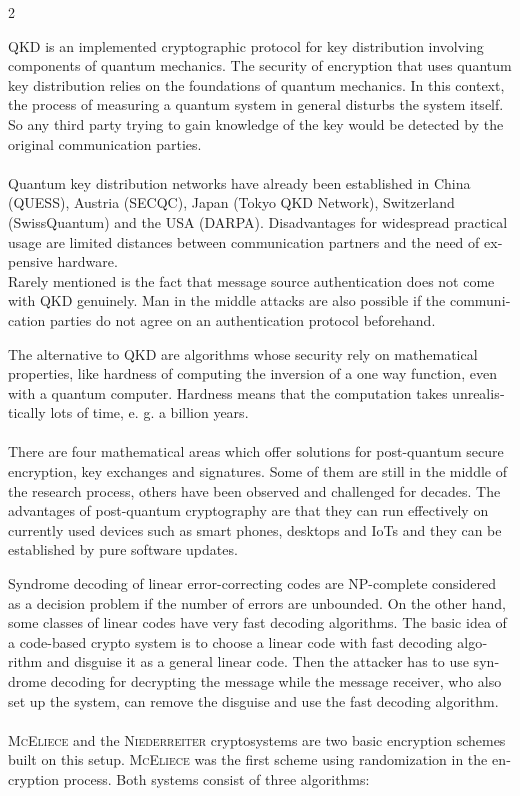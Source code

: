 \documentclass[a4paper,11pt]{article}
\begin{document}
\begin{otherlanguage}{english}
\begin{multicols}{2}

QKD is an implemented cryptographic protocol for key distribution involving components of quantum mechanics. The security of encryption that uses quantum key distribution relies on the foundations of quantum mechanics. In this context, the process of measuring a quantum system in general disturbs the system itself. So any third party trying to gain knowledge of the key would be detected by the original communication parties. \\ 
\\
Quantum key distribution networks have already been established in China (QUESS), Austria (SECQC), Japan (Tokyo QKD Network), Switzerland (SwissQuantum) and the USA (DARPA). 
Disadvantages for widespread practical usage are limited distances between communication partners and the need of expensive hardware. \\
Rarely mentioned is the fact that message source authentication does not come with QKD genuinely. Man in the middle attacks are also possible if the communication parties do not agree on an authentication protocol beforehand.  

\noindent
The alternative to QKD are algorithms whose security rely on mathematical properties, like hardness of computing the inversion of a one way function, even with a quantum computer. Hardness means that the computation takes unrealistically lots of time, e. g. a billion years. \\ \\
There are four mathematical areas which offer solutions for post-quantum secure encryption, key exchanges and signatures. Some of them are still in the middle of the research process, others have been observed and challenged for decades. The advantages of post-quantum cryptography are that they can run effectively on currently used devices such as smart phones, desktops and IoTs and they can be established by pure software updates.

Syndrome decoding of linear error-correcting codes are NP-complete considered as a decision problem if the number of errors are unbounded. On the other hand, some classes of linear codes have very fast decoding algorithms. The basic idea of a code-based crypto system is to choose a linear code with fast decoding algorithm and disguise it as a general linear code. Then the attacker has to use syndrome decoding for decrypting the message while the message receiver, who also set up the system, can remove the disguise and use the fast decoding algorithm. \\
\\
\textsc{McEliece} and the \textsc{Niederreiter} cryptosystems are two basic encryption schemes built on this setup. \textsc{McEliece} was the first scheme using randomization in the encryption process. Both systems consist of three algorithms:


\end{multicols}
\end{otherlanguage}
\end{document}
